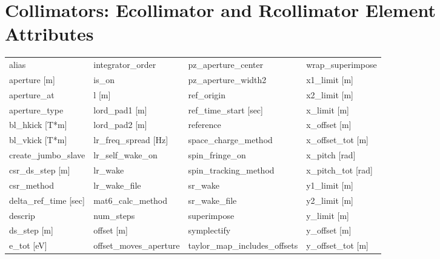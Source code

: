  \section{Collimators: Ecollimator and Rcollimator Element Attributes}
 \label{s:list.collimator}
 
 \begin{tabular}{llll} \toprule
alias                            & integrator_order                 & pz_aperture_center               & wrap_superimpose                 \\
aperture [m]                     & is_on                            & pz_aperture_width2               & x1_limit [m]                     \\
aperture_at                      & l [m]                            & ref_origin                       & x2_limit [m]                     \\
aperture_type                    & lord_pad1 [m]                    & ref_time_start [sec]             & x_limit [m]                      \\
bl_hkick [T*m]                   & lord_pad2 [m]                    & reference                        & x_offset [m]                     \\
bl_vkick [T*m]                   & lr_freq_spread [Hz]              & space_charge_method              & x_offset_tot [m]                 \\
create_jumbo_slave               & lr_self_wake_on                  & spin_fringe_on                   & x_pitch [rad]                    \\
csr_ds_step [m]                  & lr_wake                          & spin_tracking_method             & x_pitch_tot [rad]                \\
csr_method                       & lr_wake_file                     & sr_wake                          & y1_limit [m]                     \\
delta_ref_time [sec]             & mat6_calc_method                 & sr_wake_file                     & y2_limit [m]                     \\
descrip                          & num_steps                        & superimpose                      & y_limit [m]                      \\
ds_step [m]                      & offset [m]                       & symplectify                      & y_offset [m]                     \\
e_tot [eV]                       & offset_moves_aperture            & taylor_map_includes_offsets      & y_offset_tot [m]                 \\

\end{tabular}
